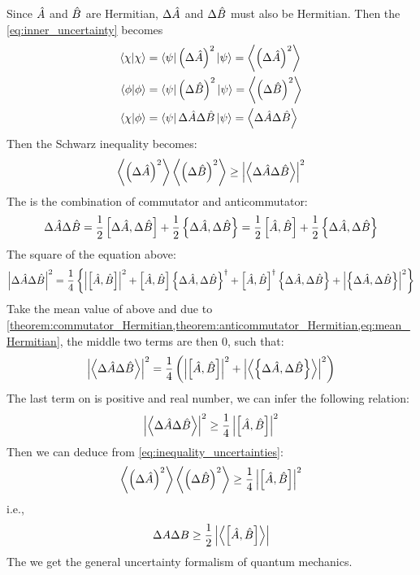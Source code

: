 Since $\hat{A}$ and $\hat{B}$ are Hermitian, $\Delta \hat{A}$ and $\Delta \hat{B}$ must also be Hermitian. Then the \cref{eq:inner_uncertainty} becomes 
\begin{align}
    \braket{\chi|\chi} &= \bra{\psi} \left(\Delta \hat{A}\right)^2 \ket{\psi} = \left\langle \left(\Delta\hat{A}\right)^2 \right\rangle \\ 
    \braket{\phi|\phi} &= \bra{\psi} \left(\Delta \hat{B}\right)^2 \ket{\psi} = \left\langle \left(\Delta\hat{B}\right)^2 \right\rangle \\
    \braket{\chi|\phi} &= \bra{\psi} \Delta \hat{A} \Delta \hat{B} \ket{\psi}  = \left\langle \Delta \hat{A} \Delta \hat{B} \right\rangle
\end{align}
Then the Schwarz inequality becomes: 
\begin{eqnarray}
    \left\langle \left(\Delta\hat{A}\right)^2 \right\rangle \left\langle \left(\Delta\hat{B}\right)^2 \right\rangle \geq \left| \left\langle \Delta \hat{A} \Delta \hat{B} \right\rangle \right|^2 \label{eq:inequality_uncertainties}
\end{eqnarray}
The \rhs is the combination of commutator and anticommutator: 
\begin{eqnarray}
    \Delta \hat{A} \Delta \hat{B} = \frac{1}{2} \left[ \Delta \hat{A} , \Delta \hat{B} \right] + \frac{1}{2} \left\{ \Delta \hat{A} , \Delta \hat{B} \right\} = \frac{1}{2} \left[ \hat{A} , \hat{B} \right] +  \frac{1}{2} \left\{ \Delta \hat{A} , \Delta \hat{B} \right\}
\end{eqnarray}
The square of the equation above: 
\begin{eqnarray}
    \left| \Delta \hat{A} \Delta \hat{B} \right|^2 =  \frac{1}{4} \left\{ \left| \left[ \hat{A} , \hat{B} \right] \right|^2 + \left[ \hat{A} , \hat{B} \right] \left\{ \Delta\hat{A} , \Delta\hat{B} \right\}^ \dag + \left[ \hat{A} , \hat{B} \right]^ \dag \left\{ \Delta\hat{A} , \Delta\hat{B} \right\} + \left| \left\{ \Delta\hat{A} , \Delta \hat{B} \right\} \right|^2 \right\}
\end{eqnarray}
Take the mean value of above and due to \cref{theorem:commutator_Hermitian,theorem:anticommutator_Hermitian,eq:mean_Hermitian}, the middle two terms are then 0, such that:
\begin{eqnarray}
    \left| \left\langle \Delta \hat{A} \Delta \hat{B} \right\rangle \right|^2 = \frac{1}{4} \left( \left| \left[ \hat{A} , \hat{B} \right] \right|^2 + \left| \left\langle \left\{ \Delta\hat{A} , \Delta\hat{B} \right\} \right\rangle \right|^2 \right)
\end{eqnarray}
The last term on \lhs is positive and real number, we can infer the following relation: 
\begin{eqnarray}
    \left| \left\langle \Delta \hat{A} \Delta \hat{B} \right\rangle \right|^2 \geq \frac{1}{4}  \left| \left[ \hat{A} , \hat{B} \right] \right|^2 
\end{eqnarray}
Then we can deduce from \cref{eq:inequality_uncertainties}: 
\begin{eqnarray}
    \left\langle \left(\Delta\hat{A}\right)^2 \right\rangle \left\langle \left(\Delta\hat{B}\right)^2 \right\rangle \geq \frac{1}{4} \left| \left[ \hat{A} , \hat{B} \right] \right|^2 
\end{eqnarray}
i.e., 
\begin{eqnarray}
    \Delta A \Delta B \geq \frac{1}{2} \left| \left\langle \left[ \hat{A} , \hat{B} \right] \right\rangle \right|
\end{eqnarray}
The we get the general uncertainty formalism of quantum mechanics.








